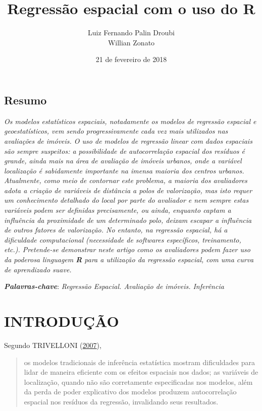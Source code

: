 \documentclass[12pt,]{article}
\title{Regressão espacial com o uso do R}
\author{Luiz Fernando Palin Droubi \\ Willian Zonato}
\date{21 de fevereiro de 2018}
\begin{document}
\maketitle

\subsection*{Resumo}\label{resumo}

\emph{Os modelos estatísticos espaciais, notadamente os modelos de
regressão espacial e geoestatísticos, vem sendo progressivamente cada
vez mais utilizados nas avaliações de imóveis. O uso de modelos de
regressão linear com dados espaciais são sempre suspeitos: a
possibilidade de autocorrelação espacial dos resíduos é grande, ainda
mais na área de avaliação de imóveis urbanos, onde a variável
localização é sabidamente importante na imensa maioria dos centros
urbanos. Atualmente, como meio de contornar este problema, a maioria dos
avaliadores adota a criação de variáveis de distância a polos de
valorização, mas isto requer um conhecimento detalhado do local por
parte do avaliador e nem sempre estas variáveis podem ser definidas
precisamente, ou ainda, enquanto captam a influência da proximidade de
um determinado polo, deixam escapar a influência de outros fatores de
valorização. No entanto, na regressão espacial, há a dificuldade
computacional (necessidade de softwares específicos, treinamento, etc.).
Pretende-se demonstrar neste artigo como os avaliadores podem fazer uso
da poderosa linguagem \textbf{R} para a utilização da regressão
espacial, com uma curva de aprendizado suave.}

\textbf{\emph{Palavras-chave}}: \emph{Regressão Espacial. Avaliação de
imóveis. Inferência}

\section{INTRODUÇÃO}\label{introducao}

Segundo TRIVELLONI (\protect\hyperlink{ref-trivelloni07}{2007}),

\begin{quote}
os modelos tradicionais de inferência estatística mostram dificuldades
para lidar de maneira eficiente com os efeitos espaciais nos dados; as
variáveis de localização, quando não são corretamente especificadas nos
modelos, além da perda de poder explicativo dos modelos produzem
autocorrelação espacial nos resíduos da regressão, invalidando seus
resultados.
\end{quote}
\end{document}
